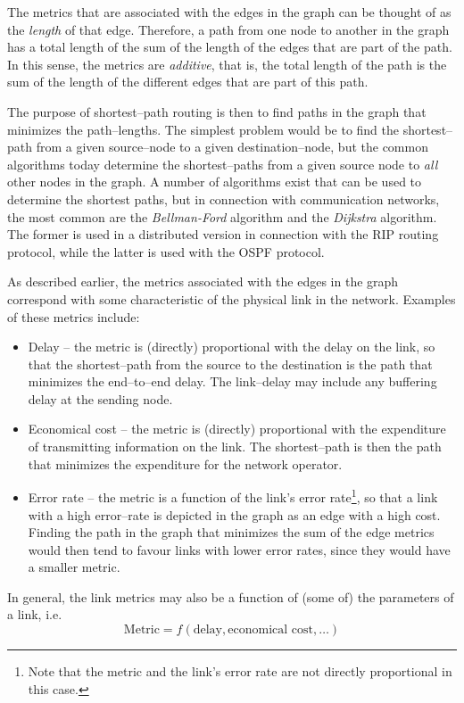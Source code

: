 \documentclass[a4paper]{article}
\begin{document}
The metrics that are associated with the edges in the graph can be thought of as the \emph{length} of that edge. Therefore, a path from one node to another in the graph has a total length of the sum of the length of the edges that are part of the path. In this sense, the metrics are \emph{additive}, that is, the total length of the path is the sum of the length of the different edges that are part of this path.

The purpose of shortest--path routing is then to find paths in the graph that minimizes the path--lengths. The simplest problem would be to find the shortest--path from a given source--node to a given destination--node, but the common algorithms today determine the shortest--paths from a given source node to \emph{all} other nodes in the graph. A number of algorithms exist that can be used to determine the shortest paths, but in connection with communication networks, the most common are the \emph{Bellman-Ford} algorithm and the \emph{Dijkstra} algorithm. The former is used in a distributed version in connection with the RIP routing protocol, while the latter is used with the OSPF protocol.

As described earlier, the metrics associated with the edges in the
graph correspond with some characteristic of the physical link in the
network. Examples of these metrics include:
\begin{itemize}
%
\item Delay -- the metric is (directly) proportional with the delay on the link, so that the shortest--path from the source to the destination is the path that minimizes the end--to--end delay. The link--delay may include any buffering delay at the sending node.
%
\item Economical cost -- the metric is (directly) proportional with the expenditure of transmitting information on the link. The shortest--path is then the path that minimizes the expenditure for the network operator.
%
\item Error rate -- the metric is a function of the link's error rate\footnote{Note that the metric and the link's error rate are not directly proportional in this case.}, so that a link with a high error--rate is depicted in the graph as an edge with a high cost. Finding the path in the graph that minimizes the sum of the edge metrics would then tend to favour links with lower error rates, since they would have a smaller metric.
%
\end{itemize}
In general, the link metrics may also be a function of (some of) the
parameters of a link, i.e.
\[
\textrm{Metric} = f(\textrm{delay}, \textrm{economical cost}, \ldots)
\]
\end{document}

